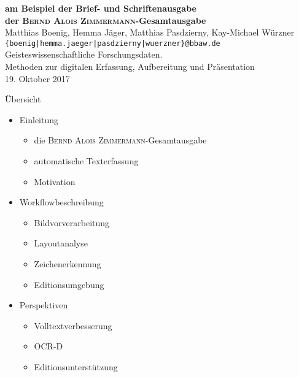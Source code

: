 \documentclass{bbawslides}
\begin{document}
\providecommand{\Title}{}


\begin{bbawtitle}
  \vspace*{0.5em}%
  \textcolor{bbawred}{\bf am Beispiel der Brief- und Schriftenausgabe\\der \textsc{Bernd Alois Zimmermann}-Gesamtausgabe}\\[4ex]
  Matthias Boenig, Hemma Jäger, Matthias Pasdzierny, Kay-Michael Würzner\\[-.25em]%
  \textcolor{urlColor}{\texttt{{\small \{boenig|hemma.jaeger|pasdzierny|wuerzner\}@bbaw.de}}}
  \\[1.5em]
  {\scriptsize{%
    Geisteswissenschaftliche Forschungsdaten.\\Methoden zur digitalen Erfassung, Aufbereitung und Präsentation\\%
    19. Oktober 2017\\%
  }}
\end{bbawtitle}
\slideStyleFrame

\renewcommand{\footerText}{\tiny 19. Oktober 2017, Workshop AG eHumanities}

\begin{bbawslide}{Übersicht}
  \vspace*{7mm}%
  \centerslidestrue%
  \begin{itemize}
    \item Einleitung
    \begin{itemize}\small
      \item die \textsc{Bernd Alois Zimmermann}-Gesamtausgabe
      \item automatische Texterfassung
      \item Motivation
    \end{itemize}
    \item Workflowbeschreibung
    \begin{itemize}\small
      \item Bildvorverarbeitung
      \item Layoutanalyse
      \item Zeichenerkennung
      \item Editionsumgebung
    \end{itemize}
    \item Perspektiven
    \begin{itemize}\small
      \item Volltextverbesserung
      \item OCR-D
      \item Editionsunterstützung
    \end{itemize}
  \end{itemize}
\end{bbawslide}
\end{document}
